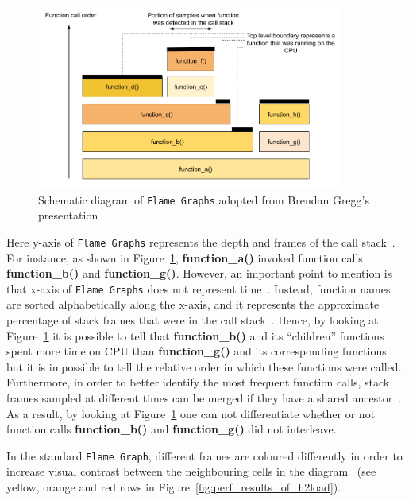 \documentclass[12pt,a4paper,twoside,openright]{report}
\begin{document}
    \begin{figure}[H]
    \centering
    \includegraphics[width=0.9\textwidth]{figs/Flame_Graphs_explanation.png}
    \caption[Schematic diagram of \texttt{Flame Graphs}]{Schematic diagram of \texttt{Flame Graphs} adopted from Brendan Gregg's presentation~\cite{USENIX_ATC2017_flamegraphs}}
    \label{fig:Flame_Graphs_explanation}
    \end{figure}

Here y-axis of \texttt{Flame Graphs} represents the depth and frames of the call stack~\cite{CPU_Flame_graphs}.
For instance, as shown in Figure~\ref{fig:Flame_Graphs_explanation}, \textbf{function\_a()} invoked function calls \textbf{function\_b()} and \textbf{function\_g()}. 
However, an important point to mention is that x-axis of \texttt{Flame Graphs} does not represent time~\cite{CPU_Flame_graphs}.
Instead, function names are sorted alphabetically along the x-axis, and it represents the approximate percentage of stack frames that were in the call stack~\cite{CPU_Flame_graphs}.
Hence, by looking at Figure~\ref{fig:Flame_Graphs_explanation} it is possible to tell that \textbf{function\_b()} and its \enquote{children} functions spent more time on CPU than \textbf{function\_g()} and its corresponding functions but it is impossible to tell the relative order in which these functions were called.
Furthermore, in order to better identify the most frequent function calls, stack frames sampled at different times can be merged if they have a shared ancestor~\cite{CPU_Flame_graphs}.
As a result, by looking at Figure~\ref{fig:Flame_Graphs_explanation} one can not differentiate whether or not function calls \textbf{function\_b()} and \textbf{function\_g()} did not interleave.

In the standard \texttt{Flame Graph}, different frames are coloured differently in order to increase visual contrast between the neighbouring cells in the diagram~\cite{CPU_Flame_graphs} (see yellow, orange and red rows in Figure~\ref{fig:perf_results_of_h2load}).
\end{document}
